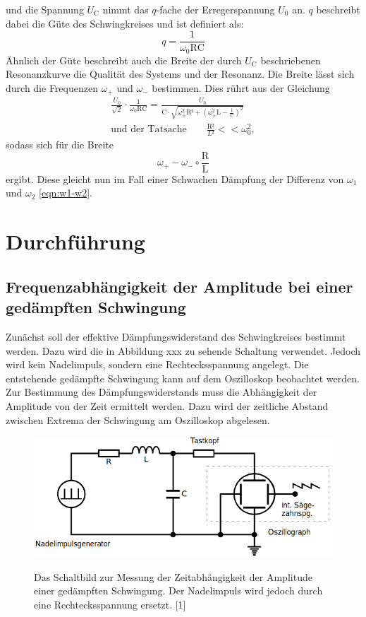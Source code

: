 \documentclass[titlepage = firstcover]{scrartcl}
\begin{document}
            und die Spannung $U_{\text{C}}$ nimmt das $q$-fache der Erregerspannung $U_0$ an.
            $q$ beschreibt dabei die Güte des Schwingkreises und ist definiert als:
            \begin{equation}
                q = \frac{1}{\omega_0 \text{RC}}
                \label{eqn:Güte}
            \end{equation}
            Ähnlich der Güte beschreibt auch die Breite der durch $U_{\text{C}}$ beschriebenen Resonanzkurve die Qualität des Systems und der Resonanz. 
            Die Breite lässt sich durch die Frequenzen $\omega_+$ und $\omega_-$ bestimmen. Dies rührt aus der Gleichung
            \begin{align*}
                \frac{U_0}{\sqrt{2}} \cdot \frac{1}{\omega_0\text{RC}} = \frac{U_0}{\text{C}\cdot \sqrt{\omega_{\pm}^2\text{R²} + \left(\omega_{\pm}^2\text{L}-\frac{1}{\text{C}}\right)^2}} \\
                \text{und der Tatsache} \qquad \frac{\text{R²}}{L²} << \omega_0^2,
            \end{align*} 
            sodass sich für die Breite
            \begin{equation}
                \omega_+ - \omega_- \circ \frac{\text{R}}{\text{L}}
            \end{equation}
            ergibt. Diese gleicht nun im Fall einer Schwachen Dämpfung der Differenz von $\omega_1$ und $\omega_2$ \ref{eqn:w1-w2}.

    \section{Durchführung}
        \subsection{Frequenzabhängigkeit der Amplitude bei einer gedämpften Schwingung}
            Zunächst soll der effektive Dämpfungswiderstand des Schwingkreises bestimmt werden. Dazu wird die in Abbildung xxx zu sehende Schaltung verwendet.
            Jedoch wird kein Nadelimpuls, sondern eine Rechtecksspannung angelegt. Die entstehende gedämpfte Schwingung kann auf dem Oszilloskop beobachtet 
            werden. Zur Bestimmung des Dämpfungswiderstands muss die Abhängigkeit der Amplitude von der Zeit ermittelt werden. Dazu wird der zeitliche Abstand
            zwischen Extrema der Schwingung am Oszilloskop abgelesen.
            \begin{figure}[h]
                \centering
                \caption{Das Schaltbild zur Messung der Zeitabhängigkeit der Amplitude einer gedämpften Schwingung. Der Nadelimpuls wird jedoch durch eine Rechtecksspannung ersetzt. [1]}
                \includegraphics[width = 0.4\linewidth]{MessungA.png}
                \label{fig:MessungA}
              \end{figure}
              \FloatBarrier
\end{document}
